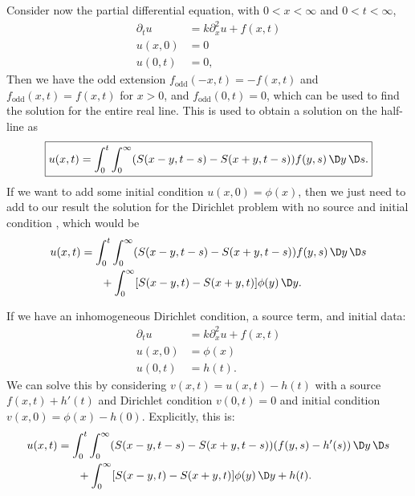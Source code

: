 \begin{node}
\begin{node}\label{pde:heat-000J}%
Consider now the partial differential equation, with $0<x<\infty$ and $0<t<\infty$,
\begin{subequations}
\begin{align}
\partial_{t}u &= k\partial_{x}^{2}u + f(x,t)\\
u(x,0) &= 0\\
u(0,t) &= 0,
\end{align}
\end{subequations}
Then we have the odd extension $f_{\text{odd}}(-x,t)=-f(x,t)$ and
$f_{\text{odd}}(x,t)=f(x,t)$ for $x>0$, and $f_{\text{odd}}(0,t)=0$,
which can be used to find the solution for the entire real line. This is
used to obtain a solution on the half-line as
\begin{equation}
\boxed{u(x,t) = \int^{t}_{0}\int^{\infty}_{0}(S(x-y,t-s)-S(x+y,t-s))f(y,s)\,\D y\,\D s.}
\end{equation}
If we want to add some initial condition $u(x,0)=\phi(x)$, then we just
need to add to our result the solution for the Dirichlet problem with no
source and initial condition , which would be
\begin{equation}
\begin{split}
u(x,t) &= \int^{t}_{0}\int^{\infty}_{0}(S(x-y,t-s)-S(x+y,t-s))f(y,s)\,\D y\,\D s\\
&\phantom{=}\quad+\int^{\infty}_{0}[S(x-y,t)-S(x+y,t)]\phi(y)\,\D y.
\end{split}
\end{equation}
\end{node} %

\begin{node}\label{pde:heat-000L}%
If we have an inhomogeneous Dirichlet condition, a source term, and
initial data:
\begin{subequations}
\begin{align}
\partial_{t}u &= k\partial_{x}^{2}u + f(x,t)\\
u(x,0) &= \phi(x)\\
u(0,t) &= h(t).
\end{align}
\end{subequations}
We can solve this by considering $v(x,t)=u(x,t)-h(t)$ with a source $f(x,t)+h'(t)$ and
Dirichlet condition $v(0,t)=0$ and initial condition $v(x,0)=\phi(x)-h(0)$.
Explicitly, this is:
\begin{equation}
\begin{split}
u(x,t) &= \int^{t}_{0}\int^{\infty}_{0}(S(x-y,t-s)-S(x+y,t-s))(f(y,s)-h'(s))\,\D y\,\D s\\
&\phantom{=}\quad+\int^{\infty}_{0}[S(x-y,t)-S(x+y,t)]\phi(y)\,\D y+h(t).
\end{split}
\end{equation}
\end{node} %


\end{node}
